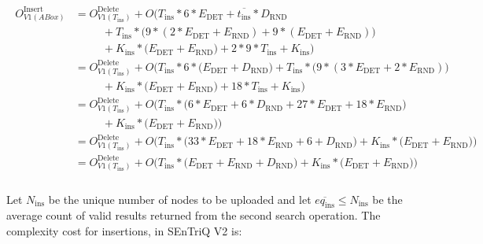 \begin{align}
    \label{equation:update-insert-v1-layout}
    \begin{split}
        O^{\text{Insert}}_{V1 (ABox)} &= O^{\text{Delete}}_{V1 (T_{\text{ins}})} +
        O\Big(
            T_{\text{ins}} * 6 * E_{\text{DET}} + \overline{t_{\text{ins}}} * D_{\text{RND}} \\%
            &\;\;\;\;\;\;\;\;\;+ T_{\text{ins}} * \big( 9 * (2 * E_{\text{DET}} + E_{\text{RND}}) + 9 * (E_{\text{DET}} + E_{\text{RND}})\big) \\ %
            &\;\;\;\;\;\;\;\;\;+ K_{\text{ins}} * \big( E_{\text{DET}} + E_{\text{RND}} \big) %
            + 2 * 9 * T_{\text{ins}} + K_{\text{ins}} %
        \Big) \\
        &= O^{\text{Delete}}_{V1 (T_{\text{ins}})} +
        O\Big(
            T_{\text{ins}} * 6 * \big(E_{\text{DET}} + D_{\text{RND}} \big) 
            + T_{\text{ins}} * \big( 9 * (3 * E_{\text{DET}} + 2 * E_{\text{RND}})\big) \\
            &\;\;\;\;\;\;\;\;\;+ K_{\text{ins}} * \big( E_{\text{DET}} + E_{\text{RND}} \big) +  18 * T_{\text{ins}} + K_{\text{ins}} 
        \Big) \\
        &= O^{\text{Delete}}_{V1 (T_{\text{ins}})} +
        O\Big(
            T_{\text{ins}} * \big( 6 * E_{\text{DET}} + 6 * D_{\text{RND}} + 27 * E_{\text{DET}} + 18 * E_{\text{RND}} \big) \\ 
        &\;\;\;\;\;\;\;\;\; + K_{\text{ins}} * \big( E_{\text{DET}} + E_{\text{RND}} \big)
        \Big) \\
        &= O^{\text{Delete}}_{V1 (T_{\text{ins}})} +
        O\Big(
            T_{\text{ins}} * \big( 33 * E_{\text{DET}} + 18 * E_{\text{RND}} + 6 + D_{\text{RND}} \big) 
            + K_{\text{ins}} * \big( E_{\text{DET}} + E_{\text{RND}} \big)
        \Big) \\
        &=  O^{\text{Delete}}_{V1 (T_{\text{ins}})} +
        O\Big(
            T_{\text{ins}} * \big( E_{\text{DET}} + E_{\text{RND}} + D_{\text{RND}}\big) + K_{\text{ins}} * \big( E_{\text{DET}} + E_{\text{RND}} \big)  
        \Big) \\
    \end{split}
\end{align}

Let $N_{\text{ins}}$ be the unique number of nodes to be uploaded and let $\overline{eq_{\text{ins}}} \leq N_{\text{ins}}$ be the average count of valid results returned from the second search operation. The complexity cost for insertions, in \gls{SEnTriQ} V2 is:

